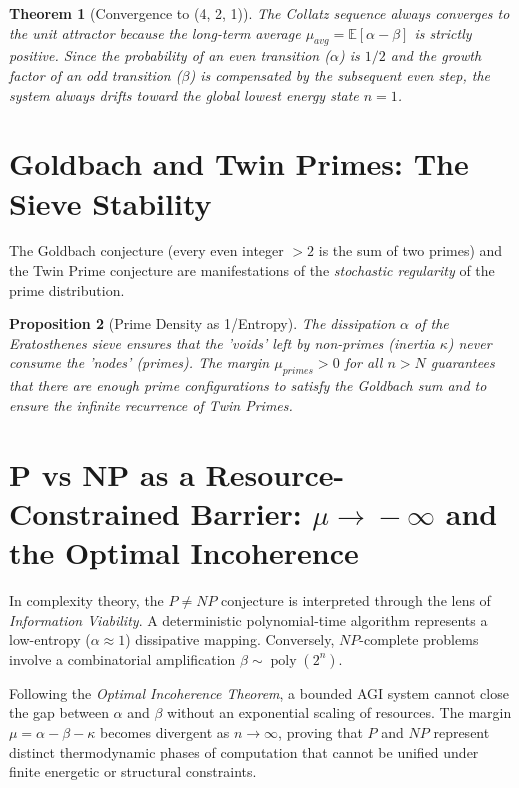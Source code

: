 \documentclass[11pt,a4paper]{amsart}
\newtheorem{theorem}{Theorem}[section]
\newtheorem{proposition}[theorem]{Proposition}
\newcommand{\alphacoeff}{\ensuremath{\alpha}}
\newcommand{\betacoeff}{\ensuremath{\beta}}
\newcommand{\kappacoeff}{\ensuremath{\kappa}}
\newcommand{\mumargin}{\ensuremath{\mu}}
\begin{document}
\begin{theorem}[Convergence to (4, 2, 1)]
The Collatz sequence always converges to the unit attractor because 
the long-term average $\mumargin_{avg} = \mathbb{E}[\alphacoeff - \betacoeff]$ 
is strictly positive. Since the probability of an even transition ($\alphacoeff$) 
is $1/2$ and the growth factor of an odd transition ($\betacoeff$) is 
compensated by the subsequent even step, the system always drifts 
toward the global lowest energy state $n=1$.
\end{theorem}

\section{Goldbach and Twin Primes: The Sieve Stability}
The Goldbach conjecture (every even integer $>2$ is the sum of two primes) 
and the Twin Prime conjecture are manifestations of the \emph{stochastic 
regularity} of the prime distribution.

\begin{proposition}[Prime Density as 1/Entropy]
The dissipation $\alphacoeff$ of the Eratosthenes sieve ensures that 
the 'voids' left by non-primes (inertia $\kappacoeff$) never consume 
 the 'nodes' (primes). The margin $\mumargin_{primes} > 0$ for 
all $n > N$ guarantees that there are enough prime configurations 
to satisfy the Goldbach sum and to ensure the infinite recurrence 
of Twin Primes.
\end{proposition}

\section{\texorpdfstring{P vs NP as a Resource-Constrained Barrier:
$\mumargin\!\to\!-\infty$ and the Optimal Incoherence}%
{P vs NP as an Entropic Search Barrier}}
In complexity theory, the $P \ne NP$ conjecture is interpreted through 
the lens of \emph{Information Viability}. A deterministic polynomial-time 
algorithm represents a low-entropy ($\alphacoeff \approx 1$) dissipative 
mapping. Conversely, $NP$-complete problems involve a combinatorial 
amplification $\betacoeff \sim \operatorname{poly}(2^n)$. 

Following the \emph{Optimal Incoherence Theorem}, a bounded AGI 
system cannot close the gap between $\alphacoeff$ and $\betacoeff$ 
without an exponential scaling of resources. The margin 
$\mumargin = \alphacoeff - \betacoeff - \kappacoeff$ becomes 
divergent as $n \to \infty$, proving that $P$ and $NP$ represent 
distinct thermodynamic phases of computation that cannot be unified 
under finite energetic or structural constraints.
\end{document}
